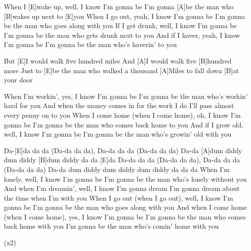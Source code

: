 

\begin{guitar}
	When I [E]wake up, well, I know I'm gonna be
	I'm gonna [A]be the man who [B]wakes up next to [E]you
	When I go out, yeah, I know I'm gonna be
	I'm gonna be the man who goes along with you
	If I get drunk, well, I know I'm gonna be
	I'm gonna be the man who gets drunk next to you
	And if I haver, yeah, I know I'm gonna be
	I'm gonna be the man who's haverin' to you
	
	But [E]I would walk five hundred miles
	And [A]I would walk five [B]hundred more
	Just to [E]be the man who walked a thousand
	[A]Miles to fall down [B]at your door
	
	When I'm workin', yes, I know I'm gonna be
	I'm gonna be the man who's workin' hard for you
	And when the money comes in for the work I do
	I'll pass almost every penny on to you
	When I come home (when I come home), oh, I know I'm gonna be
	I'm gonna be the man who comes back home to you
	And if I grow old, well, I know I'm gonna be
	I'm gonna be the man who's growin' old with you
	
	 
	
	Da-[E]da da da (Da-da da da), Da-da da da (Da-da da da)
	Da-da [A]dum diddy dum diddy [B]dum diddy da da [E]da
	Da-da da da (Da-da da da), Da-da da da (Da-da da da)
	Da-da dum diddy dum diddy dum diddy da da da
	\pagebreak
	When I'm lonely, well, I know I'm gonna be
	I'm gonna be the man who's lonely without you
	And when I'm dreamin', well, I know I'm gonna dream
	I'm gonna dream about the time when I'm with you
	When I go out (when I go out), well, I know I'm gonna be
	I'm gonna be the man who goes along with you
	And when I come home (when I come home), yes, I know I'm gonna be
	I'm gonna be the man who comes back home with you
	I'm gonna be the man who's comin' home with you
	
	 
	
	  (x2)
	
	 
\end{guitar}